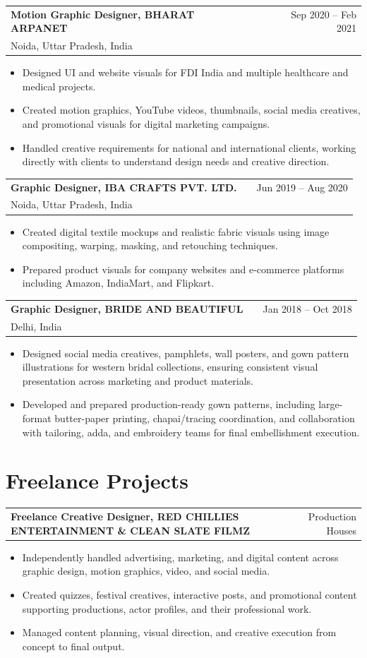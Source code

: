 \documentclass[a4paper,9pt]{article}
\makeatletter
\newenvironment{joblong}[3]
    {
    \begin{tabularx}{\linewidth}{@{}l X r@{}}
    \textbf{#1} & \hfill & {\color{textgray} #3} \\
    {\small\color{textgray} #2} & & \\[3.75pt]
    \end{tabularx}
    \begin{minipage}[t]{\linewidth}
    \begin{itemize}[nosep,after=\strut, leftmargin=1em, itemsep=3pt]
    }
    {
    \end{itemize}
    \end{minipage}
    }
\newenvironment{jobproject}[2]
    {
    \begin{tabularx}{\linewidth}{@{}l X r@{}}
    \textbf{#1} & \hfill & {\color{textgray} #2} \\[3.75pt]
    \end{tabularx}
    \begin{minipage}[t]{\linewidth}
    \begin{itemize}[nosep,after=\strut, leftmargin=1em, itemsep=3pt]
    }
    {
    \end{itemize}
    \end{minipage}
    }
\makeatother
\begin{document}
\begin{joblong}{Motion Graphic Designer, BHARAT ARPANET}{Noida, Uttar Pradesh, India}{Sep 2020 – Feb 2021}
    \item Designed UI and website visuals for FDI India and multiple healthcare and medical projects.
    \item Created motion graphics, YouTube videos, thumbnails, social media creatives, and promotional visuals for digital marketing campaigns.
    \item Handled creative requirements for national and international clients, working directly with clients to understand design needs and creative direction.
\end{joblong}


\begin{joblong}{Graphic Designer, IBA CRAFTS PVT. LTD.}{Noida, Uttar Pradesh, India}{Jun 2019 – Aug 2020}
    \item Created digital textile mockups and realistic fabric visuals using image compositing, warping, masking, and retouching techniques.
    \item Prepared product visuals for company websites and e-commerce platforms including Amazon, IndiaMart, and Flipkart.
\end{joblong}

\begin{joblong}{Graphic Designer, BRIDE AND BEAUTIFUL}{Delhi, India}{Jan 2018 – Oct 2018}
    \item Designed social media creatives, pamphlets, wall posters, and gown pattern illustrations for western bridal collections, ensuring consistent visual presentation across marketing and product materials.

    \item Developed and prepared production-ready gown patterns, including large-format butter-paper printing, chapai/tracing coordination, and collaboration with tailoring, adda, and embroidery teams for final embellishment execution.
\end{joblong}


\section{Freelance Projects}

\begin{jobproject}{Freelance Creative Designer, RED CHILLIES ENTERTAINMENT \& CLEAN SLATE FILMZ}{Production Houses}{}
    \item Independently handled advertising, marketing, and digital content across graphic design, motion graphics, video, and social media.
    \item Created quizzes, festival creatives, interactive posts, and promotional content supporting productions, actor profiles, and their professional work.
    \item Managed content planning, visual direction, and creative execution from concept to final output.
\end{jobproject}
\end{document}

